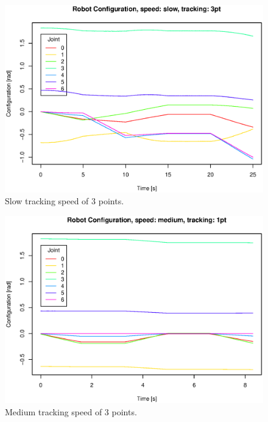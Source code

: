 \begin{figure}[H]
\centering
\includegraphics[width= \linewidth]{graphics/robotics/robotConfiguration_slow_3pt}
\caption{Slow tracking speed of 3 points.}
\label{fig:robotic_conf_slow_3pt}
\end{figure}

\begin{figure}[H]
\centering
\includegraphics[width= \linewidth]{graphics/robotics/robotConfiguration_medium_1pt}
\caption{Medium tracking speed of 3 points.}
\label{fig:robotic_conf_medium_1pt}
\end{figure}

